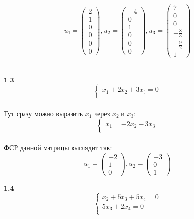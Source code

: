 \documentclass[a4paper, 12pt]{article}
\begin{document}
    \[
        u_1 = \begin{pmatrix}2 \\ 1 \\ 0 \\ 0 \\ 0 \\ 0\end{pmatrix},
        u_2 = \begin{pmatrix}-4 \\ 0 \\ 1 \\ 0 \\ 0 \\ 0\end{pmatrix},
        u_3 = \begin{pmatrix}7 \\ 0 \\ 0 \\ -\frac{8}{3} \\ -\frac{9}{2} \\ 1\end{pmatrix}
    \]
    \\
    \par \textbf{1.3}
    \begin{equation*}
        \begin{cases}
            x_1 + 2x_2 + 3x_3 = 0 \\
        \end{cases}
    \end{equation*}
    \\ Тут сразу можно выразить $x_1$ через $x_2$ и $x_3$:
    \begin{equation*}
        \begin{cases}
            x_1 = -2x_2 - 3x_3 \\
        \end{cases}
    \end{equation*}
    \\ ФСР данной матрицы выглядит так:
    \[
        u_1 = \begin{pmatrix}-2 \\ 1 \\ 0\end{pmatrix},
        u_2 = \begin{pmatrix}-3 \\ 0 \\ 1\end{pmatrix}
    \]
    \par \textbf{1.4}
    \begin{equation*}
        \begin{cases}
            x_2 + 5x_3 + 5x_4 = 0 \\
            5x_3 + 2x_4 = 0 \\
        \end{cases}
    \end{equation*}
\end{document}
